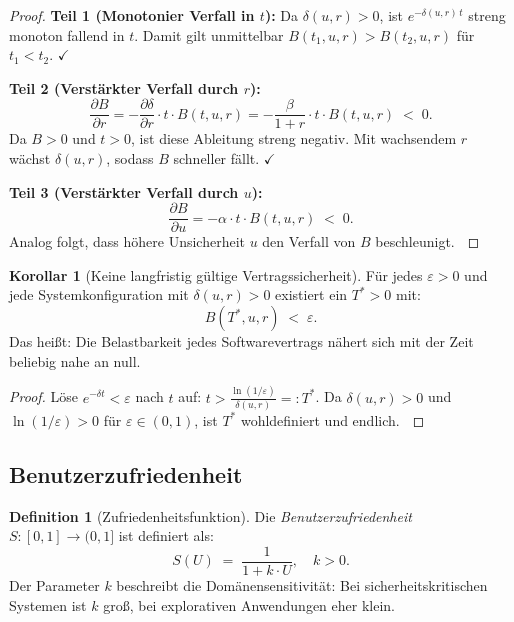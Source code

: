 ﻿\documentclass[a4paper,12pt]{article}
\theoremstyle{definition}
\newtheorem{definition}{Definition}
\newtheorem{korollar}{Korollar}
\newenvironment{beweis}{\begin{proof}}{\end{proof}}
\begin{document}
\begin{beweis}
    \textbf{Teil 1 (Monotonier Verfall in $t$):}
    Da $\delta(u,r) > 0$, ist $e^{-\delta(u,r)\,t}$ streng monoton fallend in $t$.
    Damit gilt unmittelbar $B(t_1, u, r) > B(t_2, u, r)$ f\"ur $t_1 < t_2$. $\checkmark$

    \textbf{Teil 2 (Verst\"arkter Verfall durch $r$):}
    \[
        \frac{\partial B}{\partial r}
        = -\frac{\partial \delta}{\partial r} \cdot t \cdot B(t,u,r)
        = -\frac{\beta}{1+r} \cdot t \cdot B(t,u,r) \;<\; 0.
    \]
    Da $B > 0$ und $t > 0$, ist diese Ableitung streng negativ. Mit wachsendem $r$
    w\"achst $\delta(u,r)$, sodass $B$ schneller f\"allt. $\checkmark$

    \textbf{Teil 3 (Verst\"arkter Verfall durch $u$):}
    \[
        \frac{\partial B}{\partial u}
        = -\alpha \cdot t \cdot B(t,u,r) \;<\; 0.
    \]
    Analog folgt, dass h\"ohere Unsicherheit $u$ den Verfall von $B$ beschleunigt.
    $\qedhere$
\end{beweis}

\begin{korollar}[Keine langfristig g\"ultige Vertragssicherheit]
\label{kor:langfristig}
    F\"ur jedes $\varepsilon > 0$ und jede Systemkonfiguration mit $\delta(u,r) > 0$ existiert
    ein $T^* > 0$ mit:
    \[
        B(T^*, u, r) \;<\; \varepsilon.
    \]
    Das hei\ss{}t: Die Belastbarkeit jedes Softwarevertrags n\"ahert sich mit der Zeit
    beliebig nahe an null.
\end{korollar}

\begin{beweis}
    L\"ose $e^{-\delta t} < \varepsilon$ nach $t$ auf:
    $t > \frac{\ln(1/\varepsilon)}{\delta(u,r)} =: T^*$.
    Da $\delta(u,r) > 0$ und $\ln(1/\varepsilon) > 0$ f\"ur $\varepsilon \in (0,1)$,
    ist $T^*$ wohldefiniert und endlich. $\qedhere$
\end{beweis}

\subsection{Benutzerzufriedenheit}

\begin{definition}[Zufriedenheitsfunktion]
    Die \emph{Benutzerzufriedenheit} $S\colon [0,1] \to (0,1]$ ist definiert als:
    \[
        S(U) \;=\; \frac{1}{1 + k \cdot U}, \quad k > 0.
    \]
    Der Parameter $k$ beschreibt die Dom\"anensensitivit\"at: Bei sicherheitskritischen
    Systemen ist $k$ gro\ss{}, bei explorativen Anwendungen eher klein.
\end{definition}
\end{document}
